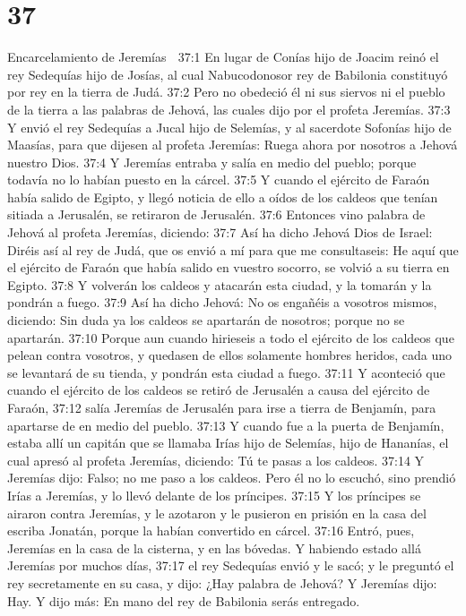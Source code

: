 \chapter{37}

Encarcelamiento de Jeremías  

37:1 En lugar de Conías hijo de Joacim reinó el rey Sedequías hijo de Josías, al cual Nabucodonosor rey de Babilonia constituyó por rey en la tierra de Judá. 
37:2 Pero no obedeció él ni sus siervos ni el pueblo de la tierra a las palabras de Jehová, las cuales dijo por el profeta Jeremías.  
37:3 Y envió el rey Sedequías a Jucal hijo de Selemías, y al sacerdote Sofonías hijo de Maasías, para que dijesen al profeta Jeremías: Ruega ahora por nosotros a Jehová nuestro Dios.  
37:4 Y Jeremías entraba y salía en medio del pueblo; porque todavía no lo habían puesto en la cárcel.  
37:5 Y cuando el ejército de Faraón había salido de Egipto, y llegó noticia de ello a oídos de los caldeos que tenían sitiada a Jerusalén, se retiraron de Jerusalén.  
37:6 Entonces vino palabra de Jehová al profeta Jeremías, diciendo:  
37:7 Así ha dicho Jehová Dios de Israel: Diréis así al rey de Judá, que os envió a mí para que me consultaseis: He aquí que el ejército de Faraón que había salido en vuestro socorro, se volvió a su tierra en Egipto. 
37:8 Y volverán los caldeos y atacarán esta ciudad, y la tomarán y la pondrán a fuego.  
37:9 Así ha dicho Jehová: No os engañéis a vosotros mismos, diciendo: Sin duda ya los caldeos se apartarán de nosotros; porque no se apartarán.  
37:10 Porque aun cuando hirieseis a todo el ejército de los caldeos que pelean contra vosotros, y quedasen de ellos solamente hombres heridos, cada uno se levantará de su tienda, y pondrán esta ciudad a fuego.  
37:11 Y aconteció que cuando el ejército de los caldeos se retiró de Jerusalén a causa del ejército de Faraón,  
37:12 salía Jeremías de Jerusalén para irse a tierra de Benjamín, para apartarse de en medio del pueblo.  
37:13 Y cuando fue a la puerta de Benjamín, estaba allí un capitán que se llamaba Irías hijo de Selemías, hijo de Hananías, el cual apresó al profeta Jeremías, diciendo: Tú te pasas a los caldeos.  
37:14 Y Jeremías dijo: Falso; no me paso a los caldeos. Pero él no lo escuchó, sino prendió Irías a Jeremías, y lo llevó delante de los príncipes.  
37:15 Y los príncipes se airaron contra Jeremías, y le azotaron y le pusieron en prisión en la casa del escriba Jonatán, porque la habían convertido en cárcel.  
37:16 Entró, pues, Jeremías en la casa de la cisterna, y en las bóvedas. Y habiendo estado allá Jeremías por muchos días,  
37:17 el rey Sedequías envió y le sacó; y le preguntó el rey secretamente en su casa, y dijo: ¿Hay palabra de Jehová? Y Jeremías dijo: Hay. Y dijo más: En mano del rey de Babilonia serás entregado.  
